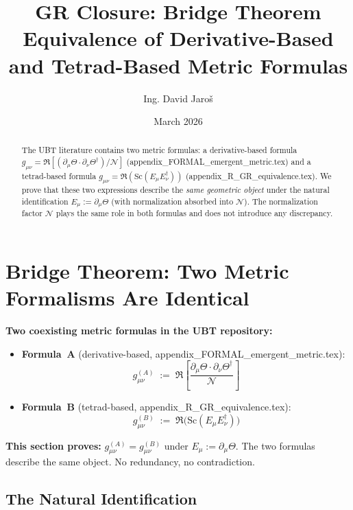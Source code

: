 \documentclass[12pt]{article}
\title{\textbf{GR Closure: Bridge Theorem\\
         Equivalence of Derivative-Based and Tetrad-Based Metric Formulas}}
\author{Ing. David Jaroš}
\date{March 2026}
\theoremstyle{definition}
\theoremstyle{remark}
\begin{document}
  \maketitle

  \begin{abstract}
  The UBT literature contains two metric formulas: a derivative-based formula
  $g_{\mu\nu} = \Re[(\partial_\mu\Theta\cdot\partial_\nu\Theta^\dagger)/\mathcal{N}]$
  (appendix\_FORMAL\_emergent\_metric.tex) and a tetrad-based formula
  $g_{\mu\nu} = \Re(\mathrm{Sc}(E_\mu E_\nu^\dagger))$
  (appendix\_R\_GR\_equivalence.tex).  We prove that these two expressions describe the
  \emph{same geometric object} under the natural identification $E_\mu := \partial_\mu\Theta$
  (with normalization absorbed into $\mathcal{N}$).  The normalization factor $\mathcal{N}$
  plays the same role in both formulas and does not introduce any discrepancy.
  \end{abstract}
\fi

\section{Bridge Theorem: Two Metric Formalisms Are Identical}
\label{sec:metric_bridge}

\begin{tcolorbox}[colback=blue!5!white,colframe=blue!75!black,title=The Gap Being Closed]
\textbf{Two coexisting metric formulas in the UBT repository:}

\begin{itemize}
  \item \textbf{Formula~A} (derivative-based, appendix\_FORMAL\_emergent\_metric.tex):
    \[
      g_{\mu\nu}^{(A)} \;:=\; \Re\!\left[\frac{\partial_\mu\Theta\cdot\partial_\nu\Theta^\dagger}{\mathcal{N}}\right]
    \]
  \item \textbf{Formula~B} (tetrad-based, appendix\_R\_GR\_equivalence.tex):
    \[
      g_{\mu\nu}^{(B)} \;:=\; \Re\!\bigl(\mathrm{Sc}(E_\mu E_\nu^\dagger)\bigr)
    \]
\end{itemize}

\textbf{This section proves:} $g_{\mu\nu}^{(A)} = g_{\mu\nu}^{(B)}$ under $E_\mu := \partial_\mu\Theta$.
The two formulas describe the same object.  No redundancy, no contradiction.
\end{tcolorbox}

\subsection{The Natural Identification}
\end{document}
